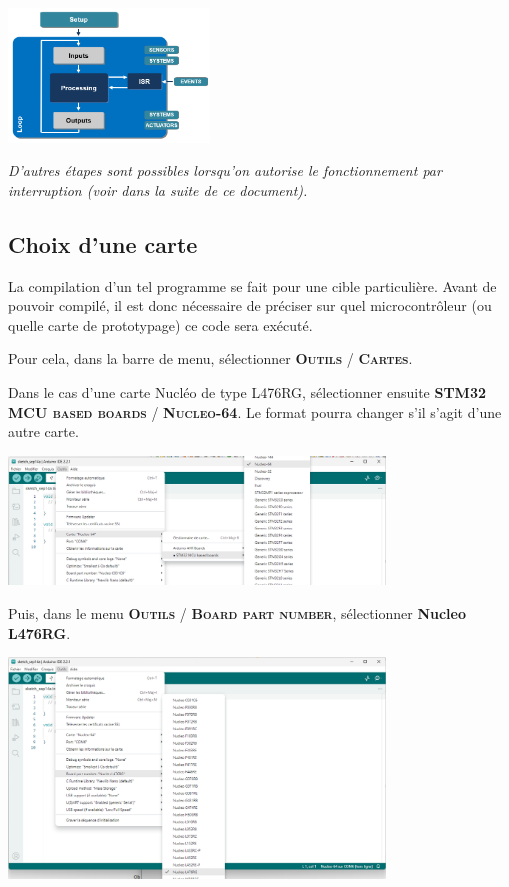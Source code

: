 \documentclass[a4paper,11pt,titlepage]{article} %
\begin{document}
\begin{center}
	\includegraphics[width=0.4\textwidth]{images/arduino_program_structure.png}
\end{center}

\textit{D'autres étapes sont possibles lorsqu'on autorise le fonctionnement par interruption (voir dans la suite de ce document).}


\subsection{Choix d'une carte}

La compilation d'un tel programme se fait pour une cible particulière. Avant de pouvoir compilé, il est donc nécessaire de préciser sur quel microcontrôleur (ou quelle carte de prototypage) ce code sera exécuté.

Pour cela, dans la barre de menu, sélectionner \textsc{\textbf{Outils} / \textbf{Cartes}}.

Dans le cas d'une carte Nucléo de type L476RG, sélectionner ensuite \textsc{\textbf{STM32 MCU based boards} / \textbf{Nucleo-64}}. Le format pourra changer s'il s'agit d'une autre carte.

\begin{center}
	\includegraphics[width=0.75\textwidth]{images/arduino_outils_cartes_nucleo64.png}
\end{center}

Puis, dans le menu \textsc{\textbf{Outils} / \textbf{Board part number}}, sélectionner \textbf{Nucleo L476RG}.

\begin{center}
	\includegraphics[width=0.75\textwidth]{images/arduino_cartes_nucleo_lxxx.png}
\end{center}
\end{document}

